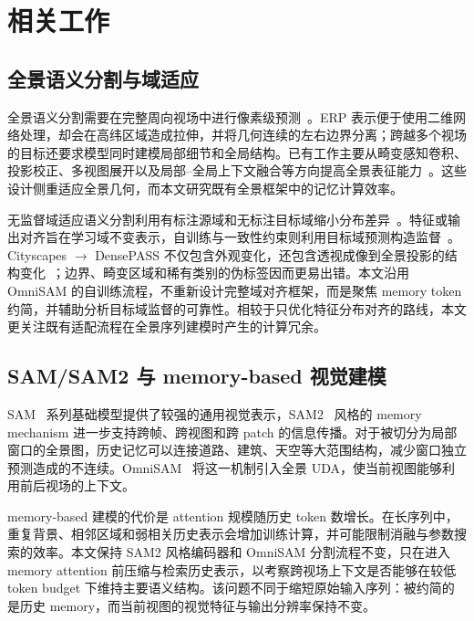 \section{相关工作}
\label{sec:related_work}

\subsection{全景语义分割与域适应}
全景语义分割需要在完整周向视场中进行像素级预测~\cite{ma2021densepass,yang2021omnirange}。ERP 表示便于使用二维网络处理，却会在高纬区域造成拉伸，并将几何连续的左右边界分离；跨越多个视场的目标还要求模型同时建模局部细节和全局结构。已有工作主要从畸变感知卷积、投影校正、多视图展开以及局部--全局上下文融合等方向提高全景表征能力~\cite{zhang2022bending,zheng2023dppass,zheng2023datr}。这些设计侧重适应全景几何，而本文研究既有全景框架中的记忆计算效率。

无监督域适应语义分割利用有标注源域和无标注目标域缩小分布差异~\cite{tsai2018adaptsegnet,zou2018cbst}。特征或输出对齐旨在学习域不变表示，自训练与一致性约束则利用目标域预测构造监督~\cite{hoyer2022daformer,hoyer2022hrda,hoyer2023mic}。Cityscapes $\rightarrow$ DensePASS 不仅包含外观变化，还包含透视成像到全景投影的结构变化~\cite{zhang2024goodsam,zhong2025omnisam}；边界、畸变区域和稀有类别的伪标签因而更易出错。本文沿用 OmniSAM 的自训练流程，不重新设计完整域对齐框架，而是聚焦 memory token 约简，并辅助分析目标域监督的可靠性。相较于只优化特征分布对齐的路线，本文更关注既有适配流程在全景序列建模时产生的计算冗余。

\subsection{SAM/SAM2 与 memory-based 视觉建模}
SAM~\cite{kirillov2023segment} 系列基础模型提供了较强的通用视觉表示，SAM2~\cite{ravi2025sam2} 风格的 memory mechanism 进一步支持跨帧、跨视图和跨 patch 的信息传播。对于被切分为局部窗口的全景图，历史记忆可以连接道路、建筑、天空等大范围结构，减少窗口独立预测造成的不连续。OmniSAM~\cite{zhong2025omnisam} 将这一机制引入全景 UDA，使当前视图能够利用前后视场的上下文。

memory-based 建模的代价是 attention 规模随历史 token 数增长。在长序列中，重复背景、相邻区域和弱相关历史表示会增加训练计算，并可能限制消融与参数搜索的效率。本文保持 SAM2 风格编码器和 OmniSAM 分割流程不变，只在进入 memory attention 前压缩与检索历史表示，以考察跨视场上下文是否能够在较低 token budget 下维持主要语义结构。该问题不同于缩短原始输入序列：被约简的是历史 memory，而当前视图的视觉特征与输出分辨率保持不变。

